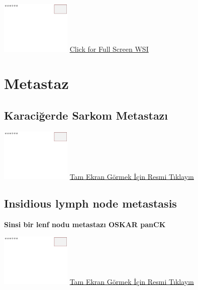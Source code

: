 \documentclass[
  letterpaper,
  paper=6in:9in,
  pagesize=pdftex,
  headinclude=on,
  footinclude=on,
  12pt]{scrbook}
\begin{document}
\href{https://images.patolojiatlasi.com/template/HE.html}{\includegraphics[width=0.25\textwidth,height=\textheight]{./screenshots/template_screenshot.png}}
\href{https://images.patolojiatlasi.com/pleomorphism/HE.html}{Click for
Full Screen WSI}

\hypertarget{sec-metastaz}{%
\chapter{Metastaz}\label{sec-metastaz}}

\hypertarget{sec-karaciger-sarkom-metastaz}{%
\section{Karaciğerde Sarkom
Metastazı}\label{sec-karaciger-sarkom-metastaz}}

\href{https://images.patolojiatlasi.com/template/HE.html}{\includegraphics[width=0.25\textwidth,height=\textheight]{./screenshots/template_screenshot.png}}
\href{https://images.patolojiatlasi.com/metastaticsarcoma/HE.html}{Tam
Ekran Görmek İçin Resmi Tıklayın}

\hypertarget{sec-insidious-lymph-node-metastasis}{%
\section{Insidious lymph node
metastasis}\label{sec-insidious-lymph-node-metastasis}}

\textbf{Sinsi bir lenf nodu metastazı OSKAR panCK}

\href{https://images.patolojiatlasi.com/template/HE.html}{\includegraphics[width=0.25\textwidth,height=\textheight]{./screenshots/template_screenshot.png}}
\href{https://images.patolojiatlasi.com/insidious-lymph-node-metastasis/OSKARCK.html}{Tam
Ekran Görmek İçin Resmi Tıklayın}
\end{document}
